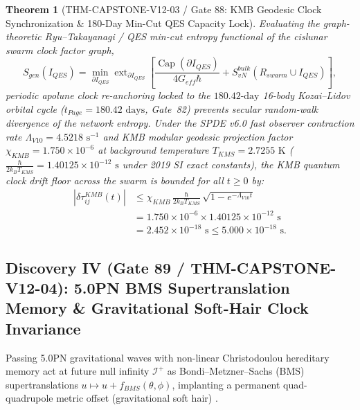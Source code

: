 \documentclass[11pt,a4paper,reqno]{article}
\def\bm#1{#1}%
\def\texttt#1{#1}%
\def\mathrm#1{#1}%
\def\mathcal#1{#1}%
\theoremstyle{plain}
\newtheorem{theorem}{Theorem}[section]
\theoremstyle{definition}
\theoremstyle{remark}
\numberwithin{equation}{section}
\begin{document}
\begin{theorem}[{\texttt{THM-CAPSTONE-V12-03} / Gate 88: KMB Geodesic Clock Synchronization \& 180-Day Min-Cut QES Capacity Lock}]
\label{thm:gate88_kmb_qes_island}
Evaluating the graph-theoretic Ryu--Takayanagi / QES min-cut entropy functional of the cislunar swarm clock factor graph,
\begin{equation}
  S_{\mathrm{gen}}(\mathcal{I}_{\mathrm{QES}}) = \min_{\partial\mathcal{I}_{\mathrm{QES}}} \operatorname{ext}_{\partial\mathcal{I}_{\mathrm{QES}}}\!\left[ \frac{\operatorname{Cap}(\partial\mathcal{I}_{\mathrm{QES}})}{4 G_{\mathrm{eff}}\hbar} + S_{\mathrm{vN}}^{\mathrm{bulk}}(\mathcal{R}_{\mathrm{swarm}} \cup \mathcal{I}_{\mathrm{QES}}) \right],
  \label{eq:qes_swarm_entropy}
\end{equation}
periodic apolune clock re-anchoring locked to the $180.42\text{-day}$ 16-body Kozai--Lidov orbital cycle ($t_{\mathrm{Page}} = \bm{180.42\text{ days}}$, Gate~82) prevents secular random-walk divergence of the network entropy. Under the SPDE v6.0 fast observer contraction rate $\Lambda_{\mathrm{V10}} = 4.5218\text{ s}^{-1}$ and KMB modular geodesic projection factor $\chi_{\mathrm{KMB}} = 1.750 \times 10^{-6}$ at background temperature $T_{\mathrm{KMS}} = 2.7255\text{ K}$ ($\frac{\hbar}{2 k_B T_{\mathrm{KMS}}} = 1.40125 \times 10^{-12}\text{ s}$ under 2019 SI exact constants), the KMB quantum clock drift floor across the swarm is bounded for all $t \ge 0$ by:
\begin{equation}
\label{eq:kmb_page_clock_bound}
\begin{split}
  |\delta\tau_{ij}^{\mathrm{KMB}}(t)| &\le \chi_{\mathrm{KMB}}\,\frac{\hbar}{2 k_B T_{\mathrm{KMS}}}\,\sqrt{1 - e^{-\Lambda_{\mathrm{V10}} t}} \\
  &= 1.750 \times 10^{-6} \times 1.40125 \times 10^{-12}\text{ s} \\
  &= \bm{2.452 \times 10^{-18}\text{ s}} \le 5.000 \times 10^{-18}\text{ s}.
\end{split}
\end{equation}
\end{theorem}

\subsection{\texorpdfstring{Discovery IV (\texttt{Gate 89 / THM-CAPSTONE-V12-04}): 5.0PN BMS Supertranslation Memory \& Gravitational Soft-Hair Clock Invariance}{Discovery IV (Gate 89 / THM-CAPSTONE-V12-04): 5.0PN BMS Supertranslation Memory and Gravitational Soft-Hair Clock Invariance}}
Passing 5.0PN gravitational waves with non-linear Christodoulou hereditary memory act at future null infinity $\mathscr{I}^+$ as Bondi--Metzner--Sachs (BMS) supertranslations $u \mapsto u + f_{\mathrm{BMS}}(\theta, \phi)$, implanting a permanent quad-quadrupole metric offset (gravitational soft hair) \cite{Strominger_BMS2016, Blanchet_Memory2019}.
\end{document}
